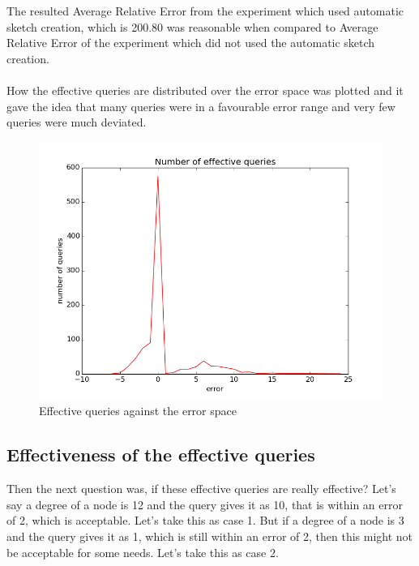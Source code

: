 \documentclass[12pt]{report}
\numberwithin{figure}{section}
\numberwithin{table}{section}
\begin{document}
The resulted Average Relative Error from the experiment which used automatic sketch creation, which is 200.80 was reasonable when compared to Average Relative Error  of the experiment which did not used the automatic sketch creation. 

\paragraph{}

How the effective queries are distributed over the error space was plotted and it gave the idea that many queries were in a favourable error range and very few queries were much deviated.

\begin{figure}[H]
\centering
\includegraphics[scale=0.6]{images/deviation-plot-AS-2init-2scale-0t-n1000-e10000-sketches-811-821-823-827-829-839plot}
\caption{ Effective queries against the error space }
\end{figure}

\subsection{Effectiveness of the effective queries }

Then the next question was, if these effective queries are really effective? Let's say a degree of a node is 12 and the query gives it as 10, that is within an error of 2, which is acceptable. Let's take this as case 1. But if a degree of a node is 3 and the query gives it as 1, which is still within an error of 2, then this might not be acceptable for some needs. Let's take this as case 2.
\end{document}
